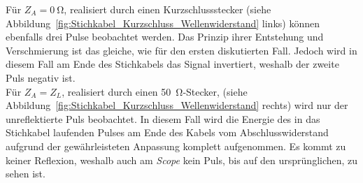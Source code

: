 \documentclass[a4paper,twoside,final]{article}
\begin{document}
Für $Z_A = \SI{0}{\ohm}$, realisiert durch einen Kurzschlussstecker (siehe Abbildung~\ref{fig:Stichkabel_Kurzschluss_Wellenwiderstand} links) können ebenfalls drei Pulse beobachtet werden. Das Prinzip ihrer Entstehung und \glqq Verschmierung\grqq{} ist das gleiche, wie für den ersten diskutierten Fall. Jedoch wird in diesem Fall am Ende des Stichkabels das Signal invertiert, weshalb der zweite Puls negativ ist. \\
Für $Z_A = Z_L$, realisiert durch einen \SI{50}{\ohm}-Stecker, (siehe Abbildung~\ref{fig:Stichkabel_Kurzschluss_Wellenwiderstand} rechts) wird nur der unreflektierte Puls beobachtet. In diesem Fall wird die Energie des in das Stichkabel laufenden Pulses am Ende des Kabels vom Abschlusswiderstand aufgrund der gewährleisteten Anpassung komplett aufgenommen. Es kommt zu keiner Reflexion, weshalb auch am \textit{Scope} kein Puls, bis auf den ursprünglichen, zu sehen ist.
\end{document}
